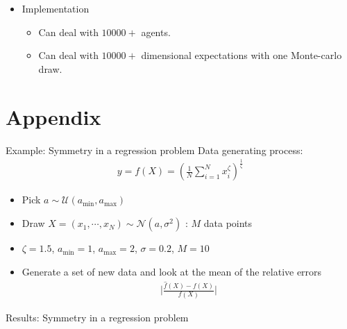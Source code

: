 \documentclass[aspectratio=169,10pt]{beamer}
\begin{document}
\begin{frame}
\begin{itemize}
				\item Implementation\vspace{0.1in}
				\begin{itemize}
					\item Can deal with $10000+$ agents.\vspace{0.1in}
					\smallskip
					\item Can deal with $10000+$ dimensional expectations with one Monte-carlo draw.\vspace{0.1in}
					\smallskip
				\end{itemize}
			\end{itemize}
			\end{frame}



\section{Appendix}


\begin{frame}[label = Reg-example]{Example: Symmetry in a regression problem}
Data generating process:
\begin{align*}
	y = f(X) = \left(\frac{1}{N}\sum_{i=1}^N x_i^{\zeta}\right)^{\frac{1}{\zeta}}
\end{align*}	
\begin{itemize}
	\item Pick  $a\sim \mathcal{U}(a_{\text{min}},a_{\text{max}})$
	\item Draw $X = (x_1,\cdots,x_N) \sim \mathcal{N}(a,\sigma^2)$ : $M$ data points
	\item $\zeta = 1.5$, $a_{\text{min}} = 1$, $a_{\text{max}} = 2$, $\sigma = 0.2$, $M = 10 $
	\item Generate a set of new data and look at the mean of the relative errors
	\begin{align*}
		\big|\frac{\hat{f}(X)-f(X)}{f(X)}\big|
	\end{align*}
\end{itemize}
\end{frame}

\begin{frame}{Results: Symmetry in a regression problem}
		\renewcommand{\arraystretch}{0.5}
	\begin{table}[h!]
		\caption{Results for the regression problem}\vspace{-0.1in}
		\begin{center}
		\end{center}
	\end{table}
	\renewcommand{\arraystretch}{1.0}
	\hyperlink{symmetry}{}
\end{frame}
\end{document}
